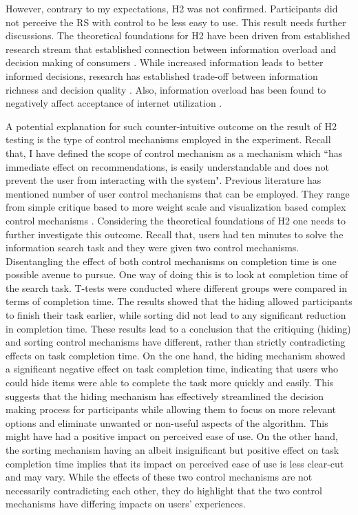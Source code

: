 \documentclass[a4paper,12pt]{article}
\begin{document}
However, contrary to my expectations, H2 was not confirmed. Participants did not perceive the RS with control to be less easy to use. This result needs further discussions. The theoretical foundations for H2 have been driven from established research stream that established connection between information overload and decision making of consumers \citep{jacoby1974brand, chenEffectsInformationOverload2009}. While increased information leads to better informed decisions, research has established trade-off between information richness and decision quality \citep{malhotra1982information, jacoby1974brand}. Also, information overload has been found to negatively affect acceptance of internet utilization \citep{shih2004extended}. 

A potential explanation for such counter-intuitive outcome on the result of H2 testing is the type of control mechanisms employed in the experiment. Recall that, I have defined the scope of control mechanism as a mechanism which ``has immediate effect on recommendations, is easily understandable and does not prevent the user from interacting with the system". Previous literature has mentioned number of user control mechanisms that can be employed. They range from simple critique based to more weight scale and visualization based complex control mechanisms \citep{jannach2017user, jinEffectsPersonalCharacteristics2018}. Considering the theoretical foundations of H2 one needs to further investigate this outcome. Recall that, users had ten minutes to solve the information search task and they were given two control mechanisms. Disentangling the effect of both control mechanisms on completion time is one possible avenue to pursue. One way of doing this is to look at completion time of the search task. T-tests were conducted where different groups were compared in terms of completion time. The results showed that the hiding allowed participants to finish their task earlier, while sorting did not lead to any significant reduction in completion time. These results lead to a conclusion that the critiquing (hiding) and sorting control mechanisms have different, rather than strictly contradicting effects on task completion time. On the one hand, the hiding mechanism showed a significant negative effect on task completion time, indicating that users who could hide items were able to complete the task more quickly and easily. This suggests that the hiding mechanism has effectively streamlined the decision making process for participants while allowing them to focus on more relevant options and eliminate unwanted or non-useful aspects of the algorithm. This might have had a positive impact on perceived ease of use. On the other hand, the sorting mechanism having an albeit insignificant but positive effect on task completion time implies that its impact on perceived ease of use is less clear-cut and may vary. While the effects of these two control mechanisms are not necessarily contradicting each other, they do highlight that the two control mechanisms have differing impacts on users' experiences. 
\end{document}
